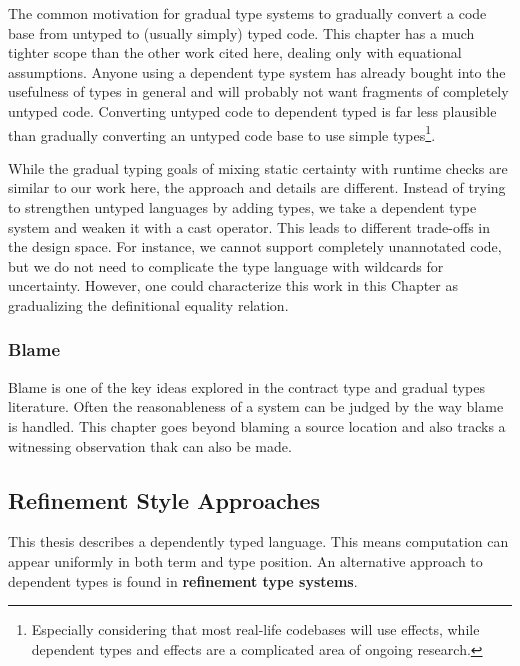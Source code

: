 The common motivation for gradual type systems to gradually convert a code base from untyped to (usually simply) typed code.
This chapter has a much tighter scope than the other work cited here, dealing only with equational assumptions.
Anyone using a dependent type system has already bought into the usefulness of types in general and will probably not want fragments of completely untyped code.
Converting untyped code to dependent typed is far less plausible than gradually converting an untyped code base to use simple types\footnote{
 Especially considering that most real-life codebases will use effects, while dependent types and effects are a complicated area of ongoing research.
 }.
 
While the gradual typing goals of mixing static certainty with runtime checks are similar to our work here, the approach and details are different.
Instead of trying to strengthen untyped languages by adding types, we take a dependent type system and weaken it with a cast operator.
This leads to different trade-offs in the design space.
For instance, we cannot support completely unannotated code, but we do not need to complicate the type language with wildcards for uncertainty.
However, one could characterize this work in this Chapter as gradualizing the definitional equality relation.
 
\subsubsection{Blame}
 
Blame is one of the key ideas explored in the contract type and gradual types literature\cite{10.1007/978-3-642-00590-9_1,wadler:LIPIcs:2015:5033,10.1145/3110283}.
Often the reasonableness of a system can be judged by the way blame is handled\cite{wadler:LIPIcs:2015:5033}.
This chapter goes beyond blaming a source location and also tracks a witnessing observation thak can also be made.
 
\subsection{Refinement Style Approaches}
 
This thesis describes a \fullSp{} dependently typed language.
This means computation can appear uniformly in both term and type position.
An alternative approach to dependent types is found in \textbf{refinement type systems}.
 

